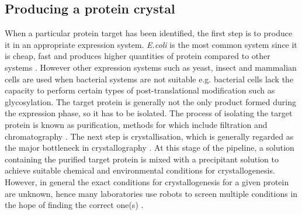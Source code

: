     \subsection{Producing a protein crystal}
    \label{sub:Producing a protein crystal}
        When a particular protein target has been identified, the first step is to produce it in an appropriate expression system.
        \textit{E.coli} is the most common system since it is cheap, fast and produces higher quantities of protein compared to other systems \cite{rai2001expression}.
        However other expression systems such as yeast, insect and mammalian cells are used when bacterial systems are not suitable e.g. bacterial cells lack the capacity to perform certain types of post-translational modification such as glycosylation.
        The target protein is generally not the only product formed during the expression phase, so it has to be isolated.
        The process of isolating the target protein is known as purification, methods for which include filtration and chromatography \cite{graslund2008protein}.
        The next step is crystallisation, which is generally regarded as the major bottleneck in crystallography \cite{garman2014}.
        At this stage of the pipeline, a solution containing the purified target protein is mixed with a precipitant solution to achieve suitable chemical and environmental conditions for crystallogenesis.
        However, in general the exact conditions for crystallogenesis for a given protein are unknown, hence many laboratories use robots to screen multiple conditions in the hope of finding the correct one(s) \cite{luft2007efficient}.

